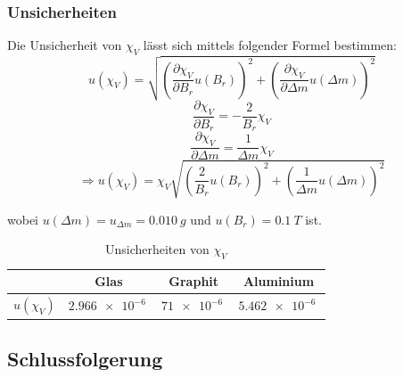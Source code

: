 \documentclass[
	a4paper,
	12pt,
	pagesize,
	ngerman
]{scrartcl}
\begin{document}
	\subsubsection*{Unsicherheiten}
	
	Die Unsicherheit von $\chi_V$ lässt sich mittels folgender Formel bestimmen:
	\begin{equation}
		u(\chi_V) = \sqrt{(\frac{\partial\chi_V}{\partial B_r}u(B_r))^2 + (\frac{\partial\chi_V}{\partial\Delta m}u(\Delta m))^2}
	\end{equation}
	\begin{equation}
		\frac{\partial\chi_V}{\partial B_r} =  -\frac{2}{B_r}\chi_V
	\end{equation}
	\begin{equation}
		\frac{\partial\chi_V}{\partial \Delta m} =  \frac{1}{\Delta m}\chi_V
	\end{equation}
	\begin{equation}
		\Rightarrow u(\chi_V) = \chi_V\sqrt{(\frac{2}{B_r}u(B_r))^2 + (\frac{1}{\Delta m}u(\Delta m))^2}
	\end{equation}
	
	wobei $u(\Delta m) =  u_{\Delta m} = \SI{0,010}{g}$ und $u(B_r) = \SI{0.1}{T}$ ist.
	
	\begin{table}[h]
		\centering
	\begin{tabular}{ r | c | c | c}
		& Glas & Graphit & Aluminium \\ \hline
		$u(\chi_V) $ &$\SI{2,966  e-6}{}$&$\SI{71 e-6}{}$&$\SI{5,462 e-6}{}$\\ \hline
	\end{tabular} \newline
	\caption{Unsicherheiten von $ \chi_V $}
	\end{table}
	\subsection{Schlussfolgerung}
	
\end{document}
